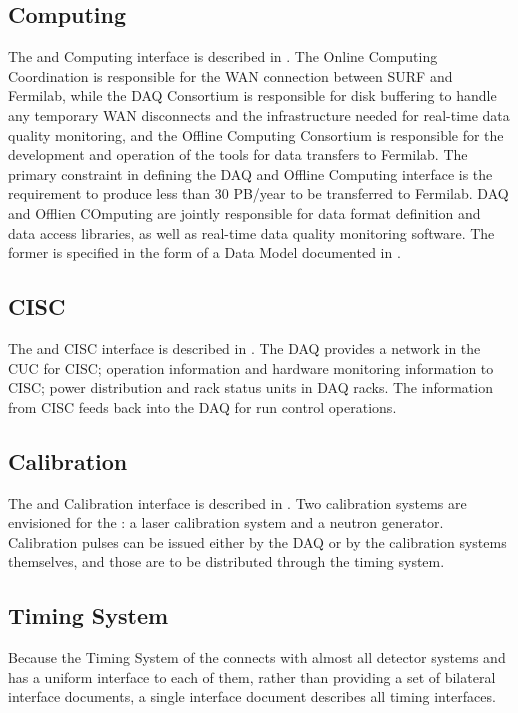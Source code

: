 \subsection{Computing}
The  and Computing interface is described in .
 The Online Computing
Coordination is responsible for the WAN connection between SURF and
Fermilab, while the DAQ Consortium is responsible for disk buffering
to handle any temporary WAN disconnects and the infrastructure needed
for real-time data quality monitoring, and the Offline Computing Consortium is
responsible for the development and operation of the tools for data
transfers to Fermilab. The primary
constraint in defining the DAQ and Offline Computing interface is the
requirement to produce less than 30 PB/year to be transferred to
Fermilab. DAQ and Offlien COmputing are jointly responsible for data
format definition and data access libraries, as well as real-time data
quality monitoring software. The former is specified in the form of a
Data Model documented in \citedocdb{}.

\subsection{CISC}
\label{sec:sp-daq:interfaces-cisc}
The  and CISC interface is described in
. The DAQ provides a network in the CUC for CISC; operation information and hardware
monitoring information to CISC; power distribution and
rack status units in DAQ racks. The information from CISC
feeds back into the DAQ for run control operations.
\subsection{Calibration}
The  and Calibration interface is described in
. Two calibration systems are envisioned for the
 : a laser calibration system and a neutron
generator. Calibration pulses can be issued either by the DAQ or by
the calibration systems themselves, and those are to be distributed through the
 timing system.
\subsection{Timing System}
Because the Timing System of the   connects with
almost all detector systems and has a uniform interface to each of
them, rather than providing a set of 
bilateral interface documents, a single interface document
 describes all timing interfaces. 

